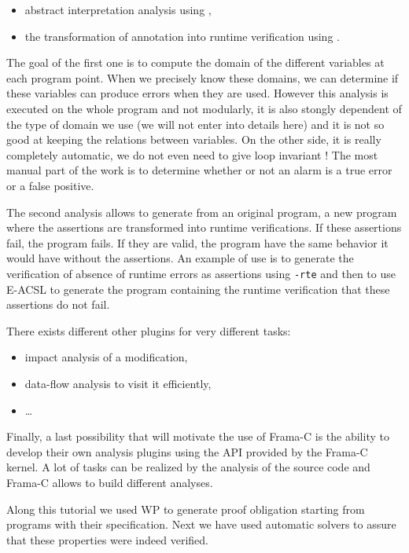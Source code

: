 \documentclass[middle]{zmdocument}
\begin{document}
\begin{itemize}
\item abstract interpretation analysis using
,
\item the transformation of annotation into runtime verification using
.
\end{itemize}

The goal of the first one is to compute the domain of the different
variables at each program point. When we precisely know these domains,
we can determine if these variables can produce errors when they are
used. However this analysis is executed on the whole program and not
modularly, it is also stongly dependent of the type of domain we use (we
will not enter into details here) and it is not so good at keeping the
relations between variables. On the other side, it is really completely
automatic, we do not even need to give loop invariant ! The most manual
part of the work is to determine whether or not an alarm is a true error
or a false positive.

The second analysis allows to generate from an original program, a new
program where the assertions are transformed into runtime verifications.
If these assertions fail, the program fails. If they are valid, the
program have the same behavior it would have without the assertions. An
example of use is to generate the verification of absence of runtime
errors as assertions using \texttt{-rte} and then to use E-ACSL to
generate the program containing the runtime verification that these
assertions do not fail.

There exists different other plugins for very different tasks:

\begin{itemize}
\item impact analysis of a modification,
\item data-flow analysis to visit it efficiently,
\item \ldots{}
\end{itemize}

Finally, a last possibility that will motivate the use of Frama-C is the
ability to develop their own analysis plugins using the API provided by
the Frama-C kernel. A lot of tasks can be realized by the analysis of
the source code and Frama-C allows to build different analyses.




Along this tutorial we used WP to generate proof obligation starting
from programs with their specification. Next we have used automatic
solvers to assure that these properties were indeed verified.
\end{document}
